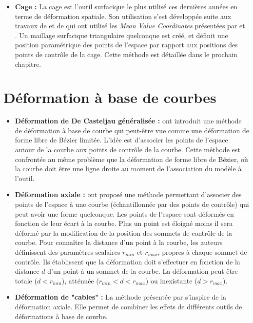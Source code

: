 \begin{itemize}
\item{\textbf{Cage :}} La cage est l'outil surfacique le plus utilisé ces
dernières années en terme de déformation spatiale. Son utilisation s'est
développée suite aux travaux de \cite{JSW05} et de \cite{FKR05} qui ont
utilisé les \textit{Mean Value Coordinates} présentées par \cite{Flo03} et
\cite{FKR05}. Un maillage surfacique triangulaire quelconque est créé, et
définit une position paramétrique des points de l'espace par rapport aux
positions des points de contrôle de la cage. Cette méthode est détaillée dans
le prochain chapitre.

\end{itemize}

\section{Déformation à base de courbes} 

\begin{itemize}

\item{\textbf{Déformation de De Casteljau généralisée :}} \cite{CR94} ont
introduit une méthode de déformation à base de courbe qui peut-être vue comme
une déformation de forme libre de Bézier limitée. L'idée est d'associer les
points de l'espace autour de la courbe aux points de contrôle de la courbe.
Cette méthode est confrontée au même problème que la déformation de forme
libre de Bézier, où la courbe doit être une ligne droite au moment de
l'association du modèle à l'outil.

\item{\textbf{Déformation axiale :}} \cite{LCJ94} ont proposé une méthode
permettant d'associer des points de l'espace à une courbe (échantillonnée par
des points de contrôle) qui peut avoir une forme quelconque. Les points de
l'espace sont déformés en fonction de leur écart à la courbe. Plus un point
est éloigné moins il sera déformé par la modification de la position des
sommets de contrôle de la courbe. Pour connaître la distance d'un point à la
courbe, les auteurs définissent des paramètres scalaires $r_{min}$ et
$r_{max}$, propres à chaque sommet de contrôle. Ils établissent que la
déformation doit s'effectuer en fonction de la distance $d$ d'un point à un
sommet de la courbe. La déformation peut-être totale ($d < r_{min}$), atténuée
($r_{min} < d < r_{max}$) ou inexistante ($d > r_{max}$).

\item{\textbf{Déformation de "cables" :}} La méthode présentée par \cite{SF98}
s'inspire de la déformation axiale. Elle permet de combiner les effets de
différents outils de déformations à base de courbe.

\end{itemize}

